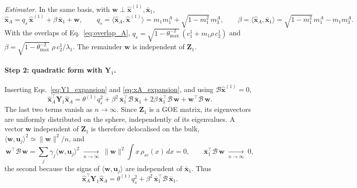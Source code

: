 \emph{Estimator.} In the same basis, with $\boldsymbol{w} \perp \hat{\boldsymbol{x}}^{(1)}, \bar{\boldsymbol{x}}_1$,
\begin{equation}
  \hat{\boldsymbol{x}}_A = q_s\, \hat{\boldsymbol{x}}^{(1)} + \beta\, \bar{\boldsymbol{x}}_1 + \boldsymbol{w},
  \qquad
  q_s = \langle \hat{\boldsymbol{x}}_A, \hat{\boldsymbol{x}}^{(1)}\rangle = m_1 m_1^A + \sqrt{1-m_1^2}\, m_3^A,
  \qquad
  \beta = \langle \hat{\boldsymbol{x}}_A, \bar{\boldsymbol{x}}_1\rangle = \sqrt{1-m_1^2}\, m_1^A - m_1 m_3^A .
  \label{eq:xA_expansion}
\end{equation}
With the overlaps of Eq.~\eqref{eq:overlap_A}, $q_s = \sqrt{1-\theta_{\max}^{-2}}\,(c_1^1 + m_1\rho\, c_2^1)$ and
$\beta = \sqrt{1-\theta_{\max}^{-2}}\;\rho\, c_2^1/\lambda_1$.
The remainder $\boldsymbol{w}$ is independent of $\mathbf{Z}_1$.

\paragraph{Step 2: quadratic form with $\mathbf{Y}_1$.}
Inserting Eqs.~\eqref{eq:Y1_expansion} and \eqref{eq:xA_expansion}, and using $\mathcal{B}\hat{\boldsymbol{x}}^{(1)} = 0$,
\begin{equation}
  \hat{\boldsymbol{x}}_A^\top \mathbf{Y}_1 \hat{\boldsymbol{x}}_A
  = \theta^{(1)} q_s^2
  + \beta^2\, \bar{\boldsymbol{x}}_1^\top \mathcal{B}\, \bar{\boldsymbol{x}}_1
  + 2\beta\, \bar{\boldsymbol{x}}_1^\top \mathcal{B}\, \boldsymbol{w}
  + \boldsymbol{w}^\top \mathcal{B}\, \boldsymbol{w} .
\end{equation}
The last two terms vanish as $n\to\infty$. Since $\mathbf{Z}_1$ is a GOE matrix, its eigenvectors are uniformly
distributed on the sphere, independently of its eigenvalues. A vector $\boldsymbol{w}$ independent of $\mathbf{Z}_1$
is therefore delocalised on the bulk, $\langle \boldsymbol{w}, \boldsymbol{u}_j\rangle^2 \simeq \|\boldsymbol{w}\|^2/n$, and
\begin{equation}
  \boldsymbol{w}^\top \mathcal{B}\, \boldsymbol{w}
  = \sum_{j} \gamma_j \langle \boldsymbol{w}, \boldsymbol{u}_j\rangle^2
  \;\xrightarrow[n\to\infty]{}\; \|\boldsymbol{w}\|^2 \int x\, \rho_{sc}(x)\, dx = 0 ,
  \qquad
  \bar{\boldsymbol{x}}_1^\top \mathcal{B}\, \boldsymbol{w} \;\xrightarrow[n\to\infty]{}\; 0 ,
\end{equation}
the second because the signs of $\langle \boldsymbol{w}, \boldsymbol{u}_j\rangle$ are independent of $\bar{\boldsymbol{x}}_1$. Thus
\begin{equation}
  \hat{\boldsymbol{x}}_A^\top \mathbf{Y}_1 \hat{\boldsymbol{x}}_A
  = \theta^{(1)} q_s^2 + \beta^2\, \bar{\boldsymbol{x}}_1^\top \mathcal{B}\, \bar{\boldsymbol{x}}_1 .
  \label{eq:xAY1xA}
\end{equation}


